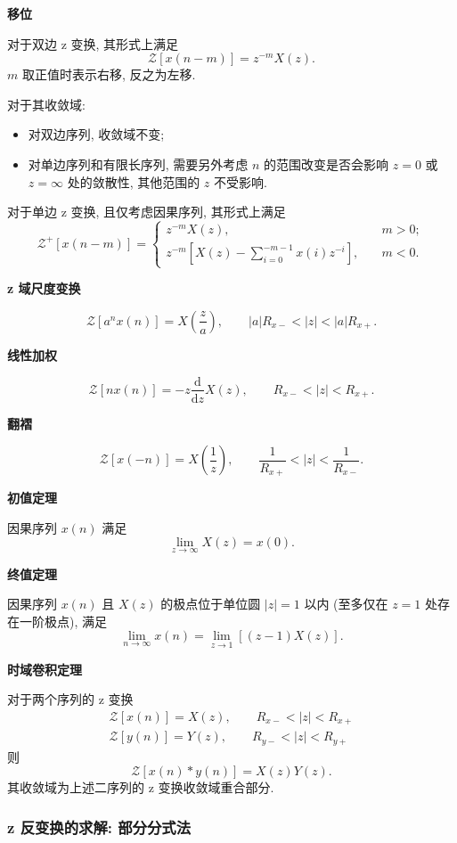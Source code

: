 \textbf{移位}

对于双边 z 变换, 其形式上满足
\begin{equation}
    \mathcal{Z}[x(n-m)]=z^{-m}X(z).
\end{equation}
$m$ 取正值时表示右移, 反之为左移.

对于其收敛域:
\begin{itemize}
    \item 对双边序列, 收敛域不变;
    \item 对单边序列和有限长序列, 需要另外考虑 $n$ 的范围改变是否会影响 $z=0$ 或 $z=\infty$ 处的敛散性, 其他范围的 $z$ 不受影响.
\end{itemize}

对于单边 z 变换, 且仅考虑因果序列, 其形式上满足
\begin{equation}
    \mathcal{Z}^+[x(n-m)]=\begin{cases}
        z^{-m}X(z),                                          & \quad m>0; \\
        z^{-m}\left[X(z)-\sum_{i=0}^{-m-1}x(i)z^{-i}\right], & \quad m<0.
    \end{cases}
\end{equation}

\textbf{z 域尺度变换}

\begin{equation}
    \mathcal{Z}[a^nx(n)]=X\left(\frac{z}{a}\right), \qquad |a|R_{x-}<|z|<|a|R_{x+}.
\end{equation}

\textbf{线性加权}

\begin{equation}
    \mathcal{Z}[nx(n)]=-z\frac{\mathrm{d}}{\mathrm{d}z}X(z), \qquad R_{x-}<|z|<R_{x+}.
\end{equation}

\textbf{翻褶}

\begin{equation}
    \mathcal{Z}[x(-n)]=X\left(\frac{1}{z}\right), \qquad \frac{1}{R_{x+}}<|z|<\frac{1}{R_{x-}}.
\end{equation}

\textbf{初值定理}

因果序列 $x(n)$ 满足
\begin{equation}
    \lim_{z\rightarrow\infty}X(z)=x(0).
\end{equation}

\textbf{终值定理}

因果序列 $x(n)$ 且 $X(z)$ 的极点位于单位圆 $|z|=1$ 以内 (至多仅在 $z=1$ 处存在一阶极点), 满足
\begin{equation}
    \lim_{n\rightarrow\infty}x(n)=\lim_{z\rightarrow 1}[(z-1)X(z)].
\end{equation}

\textbf{时域卷积定理}

对于两个序列的 z 变换
\begin{gather}
    \mathcal{Z}[x(n)]=X(z), \qquad R_{x-}<|z|<R_{x+} \\
    \mathcal{Z}[y(n)]=Y(z), \qquad R_{y-}<|z|<R_{y+}
\end{gather}
则
\begin{equation}
    \mathcal{Z}[x(n)*y(n)]=X(z)Y(z).
\end{equation}
其收敛域为上述二序列的 z 变换收敛域重合部分.

\subsubsection{z 反变换的求解: 部分分式法}
